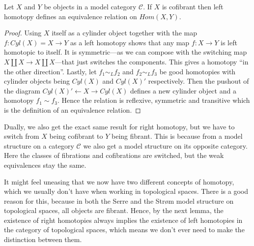 \begin{lemma}
Let $X$ and $Y$ be objects in a model category $\mathcal{C}$. If $X$ is cofibrant then left homotopy defines an equivalence relation on $Hom(X,Y)$.
\end{lemma}
\begin{proof}
Using $X$ itself as a cylinder object together with the map $f:Cyl(X)=X\rightarrow Y$ as a left homotopy shows that any map $f:X\rightarrow Y$ is left homotopic to itself. It is symmetric---as we can compose with the switching map $X\coprod X \rightarrow X\coprod X$---that just switches the components. This gives a homotopy “in the other direction”. Lastly, let $f_1\sim_L f_2$ and $f_2\sim_L f_3$ be good homotopies with cylinder objects being $Cyl(X)$ and $Cyl(X)'$ respectively. Then the pushout of the diagram $Cyl(X)' \leftarrow X \rightarrow Cyl(X)$ defines a new cylinder object and a homotopy $f_1\sim f_3$. Hence the relation is reflexive, symmetric and transitive which is the definition of an equivalence relation.
\end{proof}

Dually, we also get the exact same result for right homotopy, but we have to switch from $X$ being cofibrant to $Y$ being fibrant. This is because from a model structure on a category $\mathcal{C}$ we also get a model structure on its opposite category. Here the classes of fibrations and cofibrations are switched, but the weak equivalences stay the same. 

It might feel uneasing that we now have two different concepts of homotopy, which we usually don't have when working in topological spaces. There is a good reason for this, because in both the Serre and the Strøm model structure on topological spaces, all objects are fibrant. Hence, by the next lemma, the existence of right homotopies always implies the existence of left homotopies in the category of topological spaces, which means we don’t ever need to make the distinction between them.

